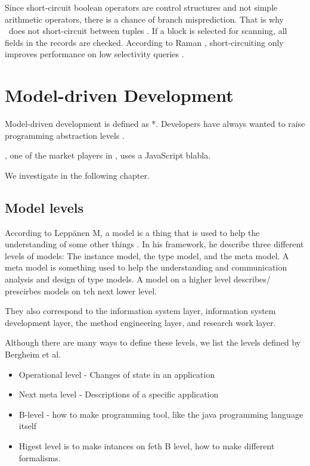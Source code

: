 Since short-circuit boolean operators are control structures and not simple arithmetic operators, there is a chance of branch misprediction. That is why \blink~does not short-circuit between tuples \cite{Raman2008-gi, Johnson2008-cp}. If a block is selected for scanning, all fields in the records are checked. According to Raman \ea, short-circuiting only improves performance on low selectivity queries \cite{Raman2008-gi}.

\section{Model-driven Development}
\label{sec:Model-driven Development}
Model-driven development is defined as *. Developers have always wanted to raise programming abstraction levels \cite{Atkinson2003-wr}.


\mendix, one of the market players in \mdd, uses a JavaScript blabla.

We investigate \gap in the following chapter.

\subsection{Model levels}
\label{sub:Model levels}
According to Leppänen M, a model is a thing that is used to help the understanding of some other things \cite{Leppanen2006-ay}. In his framework, he describe three different levels of models: The instance model, the type model, and the meta model. A meta model is something used to help the understanding and communication analysis and design of type models. A model on a higher level describes/ prescirbes models on teh next lower level.

They also correspond to the information system layer, information system development layer, the method engineering layer, and research work layer.

Although there are many ways to define these levels, we list the levels defined by Bergheim et al.
\begin{itemize}
    \item Operational level - Changes of state in an application
    \item Next meta level - Descriptions of a specific application
    \item B-level - how to make programming tool, like the java programming language itself
    \item Higest level is to make intances on feth B level, how to make different formalisms.
\end{itemize}

